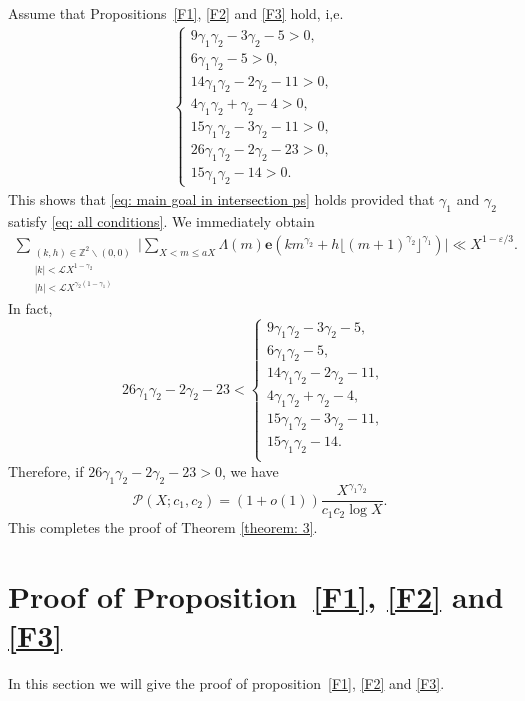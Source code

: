 \documentclass[12pt, reqno, twoside, letterpaper]{amsart}
\numberwithin{equation}{section}
\newcommand{\e}{\ensuremath{\mathbf{e}}}
\newcommand{\cL}{\ensuremath{\mathcal{L}}}
\newcommand{\cP}{\ensuremath{\mathcal{P}}}
\newcommand{\ZZ}{\ensuremath{\mathbb{Z}}}
\theoremstyle{customthm}
\theoremstyle{customrem}
\begin{document}
Assume that Propositions~\ref{F1}, \ref{F2} and \ref{F3}
hold, i,e.
\begin{align}\label{eq: all conditions}
	\left\{\begin{array}{ll}
		9\gamma_1\gamma_2-3\gamma_2-5>0, & \\
		6\gamma_1\gamma_2-5>0, & \\
		14\gamma_1\gamma_2-2\gamma_2-11>0, & \\
		4\gamma_1\gamma_2+\gamma_2-4>0, & \\
15\gamma_1\gamma_2-3\gamma_2-11>0, &\\
26\gamma_1\gamma_2-2\gamma_2-23>0, & \\
			15\gamma_1\gamma_2-14>0.
	\end{array}\right.
\end{align}
This shows that \eqref{eq: main goal in intersection ps} holds provided that $\gamma_1$ and $\gamma_2$ satisfy \eqref{eq: all conditions}. We immediately obtain
\begin{align*}
	\sum_{\substack{(k,h) \in \ZZ^2 \backslash (0,0) \\ |k|<\cL X^{1-\gamma_2} \\ |h|<\cL X^{\gamma_2(1-\gamma_1)}}} \Big| \sum_{X < m \leqslant aX} \Lambda(m) \e (km^{\gamma_2} + h\lfloor(m+1)^{\gamma_2}\rfloor^{\gamma_1})\Big|\ll X^{1-\varepsilon/3}.
\end{align*}
In fact,
$$
26\gamma_1\gamma_2-2\gamma_2-23<
\left\{\begin{array}{ll}
	9\gamma_1\gamma_2-3\gamma_2-5, & \\
	6\gamma_1\gamma_2-5, & \\
	14\gamma_1\gamma_2-2\gamma_2-11, & \\
	4\gamma_1\gamma_2+\gamma_2-4, & \\
15\gamma_1\gamma_2-3\gamma_2-11, &\\
			15\gamma_1\gamma_2-14. & \\
\end{array}\right.
$$
Therefore, if $26\gamma_1\gamma_2-2\gamma_2-23>0$, we have
$$
\cP(X;c_1,c_2)=(1+o(1))\frac{X^{\gamma_1\gamma_2}}{c_1c_2\log X}.
$$
This completes the proof of Theorem \ref{theorem: 3}.



\section{Proof of Proposition~\ref{F1}, \ref{F2} and \ref{F3} } \label{section: 9}

In this section we will give the proof of proposition~\ref{F1}, \ref{F2} and \ref{F3}.
\end{document}
